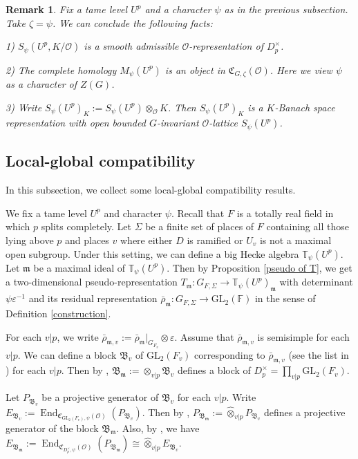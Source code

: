 \documentclass[a4paper, 12pt]{amsart}
\newtheorem{rem}[thm]{\bf Remark}
\DeclareMathOperator{\End}{End}
\newcommand{\F}{\mathbb{F}}
\newcommand{\T}{\mathbb{T}}
\newcommand{\GL}{\mathrm{GL}}
\newcommand{\cO}{\mathcal{O}}
\newcommand{\kC}{\mathfrak{C}}
\newcommand{\kB}{\mathfrak{B}}
\newcommand{\km}{\mathfrak{m}}
\begin{document}
    \begin{rem}
    	Fix a tame level $U^p$ and a character $\psi$ as in the previous subsection. Take $\zeta=\psi$. We can conclude the following facts:
    	
    	1) $S_\psi(U^p, K/\cO)$ is a smooth admissible $\cO$-representation of $D_p^\times$.
    	
    	2) The complete homology $M_\psi(U^p)$ is an object in $ \kC_{G,\zeta}(\cO)$. Here we view $\psi$ as a character of $Z(G)$.
    	
    	3) Write $S_\psi(U^p)_K :=S_\psi(U^p) \otimes_\cO K$. Then $S_\psi(U^p)_K$ is a $K$-Banach space representation with open bounded $G$-invariant $\cO$-lattice $S_\psi(U^p) $.
    \end{rem}
    
    \subsection{Local-global compatibility}
    In this subsection, we collect some local-global compatibility results.
    
    We fix a tame level $U^p$ and character $\psi$. Recall that $F$ is a totally real field in which $p$ splits completely. Let $\Sigma$ be a finite set of places of $F$ containing all those lying above $p$ and places $v$ where either $D$ is ramified or $U_v$ is not a maximal open subgroup. Under this setting, we can define a big Hecke algebra $\T_{\psi}(U^p)$. Let $\km$ be a maximal ideal of $\T_{\psi}(U^p)$. Then by Proposition \ref{pseudo of T}, we get a two-dimensional pseudo-representation $T_\km : G_{F,\Sigma} \to \T_{\psi}(U^p)_\km$ with determinant $\psi\varepsilon^{-1}$ and its residual representation $\bar{\rho}_\km : G_{F,\Sigma} \to \GL_2(\F)$ in the sense of 
    Definition \ref{construction}. 
    
    For each $v|p$, we write $\bar{\rho}_{\km, v} := \bar{\rho}_\km|_{G_{F_v}} \otimes \varepsilon$. Assume that $\bar{\rho}_{\km, v}$ is semisimple for each $v|p$.  We can define a block $\kB_v$ of $\GL_2(F_v)$ corresponding to $\bar{\rho}_{\km, v}$ (see the list in \cite[Appendix A.2]{Zhang:2024aa}) for each $v|p$. Then by \cite[Lemma 3.4.7]{pan2022fontaine}, $\kB_\km := \otimes_{v|p} \kB_v$ defines a block of $D_p^\times=\prod_{v|p} \GL_2(F_v)$. 
    
    Let $P_{\kB_v}$ be a projective generator of $\kB_v$ for each $v|p$. Write $E_{\kB_v}:= \End_{\kC_{\GL_2(F_v),\psi}(\cO)}(P_{\kB_v})$.   Then by \cite[Lemma 3.4.5]{pan2022fontaine}, $P_{\kB_\km} := \widehat{\otimes}_{v|p} P_{\kB_v}$ defines a projective generator of the block $\kB_\km$. Also, by \cite[Proposition 3.3.2]{Zhang:2024aa}, we have $ E_{\kB_\km}:=\End_{\kC_{D_p^\times,\psi}(\cO)}(P_{\kB_\km}) \cong  \widehat{\otimes}_{v|p} E_{\kB_v}$.
    
\end{document}
